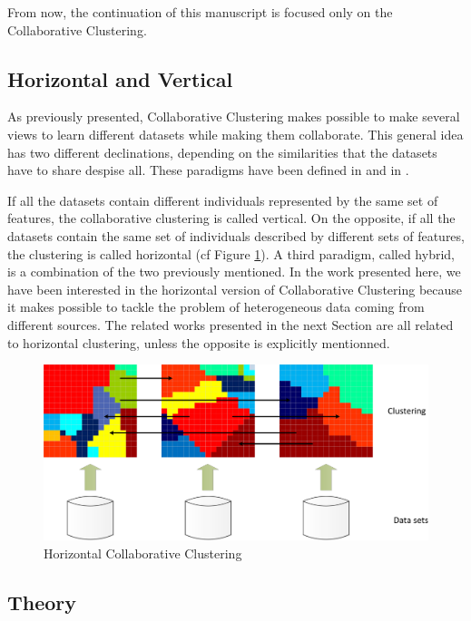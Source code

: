 \documentclass[a4paper]{report}
\begin{document}
    From now, the continuation of this manuscript is focused only on the Collaborative Clustering.

    \subsection{Horizontal and Vertical}

    As previously presented, Collaborative Clustering makes possible to make several views to learn different datasets while making them collaborate. This general idea has two different declinations, depending on the similarities that the datasets have to share despise all. These paradigms have been defined in \cite{pedrycz2005knowledge} and in \cite{grozavu2010topological}.

    If all the datasets contain different individuals represented by the same set of features, the collaborative clustering is called vertical. On the opposite, if all the datasets contain the same set of individuals described by different sets of features, the clustering is called horizontal (cf Figure \ref{fig:hor_cc}). A third paradigm, called hybrid, is a combination of the two previously mentioned. In the work presented here, we have been interested in the horizontal version of Collaborative Clustering because it makes possible to tackle the problem of heterogeneous data coming from different sources. The related works presented in the next Section are all related to horizontal clustering, unless the opposite is explicitly mentionned.
    \vspace{.8cm}

        \begin{figure}[h]
            \centering
            \includegraphics[scale=0.2]{hcc}
            \caption{Horizontal Collaborative Clustering}
            \label{fig:hor_cc}
        \end{figure}

    \subsection{Theory}
    
\end{document}

